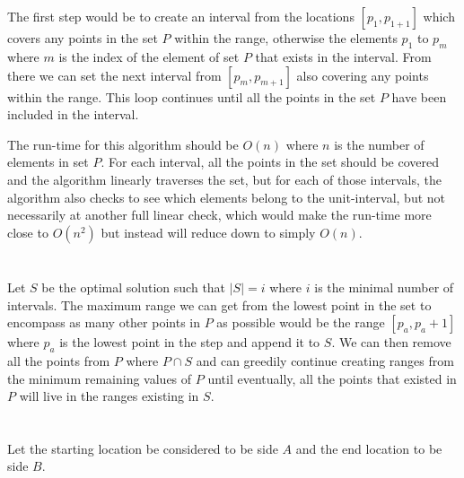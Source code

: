 \documentclass[12pt]{article}
\begin{document}
\maketitle

\section{}
The first step would be to create an interval from the locations \([p_1, p_{1+1}]\) which covers any points in the set \(P\) within the range, otherwise the elements \(p_1\) to \(p_m\) where \(m\) is the index of the element of set \(P\) that exists in the interval. From there we can set the next interval from \([p_m, p_{m+1}]\) also covering any points within the range. This loop continues until all the points in the set \(P\) have been included in the interval.\newline

\noindent The run-time for this algorithm should be \(O(n)\) where \(n\) is the number of elements in set \(P\). For each interval, all the points in the set should be covered and the algorithm linearly traverses the set, but for each of those intervals, the algorithm also checks to see which elements belong to the unit-interval, but not necessarily at another full linear check, which would make the run-time more close to \(O(n^2)\) but instead will reduce down to simply \(O(n)\).

\section{}
\begin{center}
Let \(S\) be the optimal solution such that \(|S| = i\) where \(i\) is the minimal number of intervals. The maximum range we can get from the lowest point in the set to encompass as many other points in \(P\) as possible would be the range \([p_a, p_a+1]\) where \(p_a\) is the lowest point in the step and append it to \(S\). We can then remove all the points from \(P\) where \(P \cap S\) and can greedily continue creating ranges from the minimum remaining values of \(P\) until eventually, all the points that existed in \(P\) will live in the ranges existing in \(S\).
\end{center}

\section{}
Let the starting location be considered to be side \(A\) and the end location to be side \(B\).\newline
\end{document}
